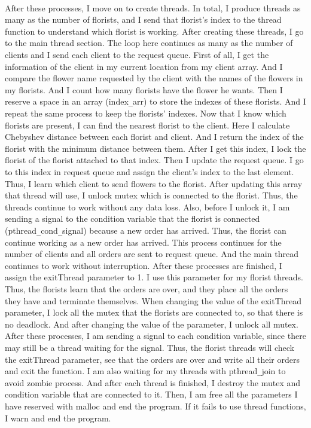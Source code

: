 \documentclass{article}
\begin{document}
\paragraph{}
After these processes, I move on to create threads. In total, I produce threads
as many as the number of florists, and I send that florist's index to the thread
function to understand which florist is working. After creating these threads, I
go to the main thread section. The loop here continues as many as the number
of clients and I send each client to the request queue. First of all, I get the
information of the client in my current location from my client array. And I
compare the flower name requested by the client with the names of the flowers
in my florists. And I count how many florists have the flower he wants. Then I
reserve a space in an array (index\verb!_!arr) to store the indexes of these florists. And I repeat the same process to keep the florists' indexes. Now that I know
which florists are present, I can find the nearest florist to the client. Here I
calculate Chebyshev distance between each florist and client. And I return the
index of the florist with the minimum distance between them. After I get this
index, I lock the florist of the florist attached to that index. Then I update the
request queue. I go to this index in request queue and assign the client's index
to the last element. Thus, I learn which client to send flowers to the florist. After
updating this array that thread will use, I unlock mutex which is connected to
the florist. Thus, the threads continue to work without any data loss. Also, before I unlock it, I am sending a signal to the condition variable that the florist
is connected (pthread\verb!_!cond\verb!_!signal) because a new order has arrived. Thus,
the florist can continue working as a new order has arrived. This process
continues for the number of clients and all orders are sent to request queue. And the main thread continues to work without interruption. After these
processes are finished, I assign the exitThread parameter to 1. I use this
parameter for my florist threads. Thus, the florists learn that the orders are over, and they place all the orders they have and terminate themselves. When
changing the value of the exitThread parameter, I lock all the mutex that the
florists are connected to, so that there is no deadlock. And after changing the
value of the parameter, I unlock all mutex. After these processes, I am sending
a signal to each condition variable, since there may still be a thread waiting for
the signal. Thus, the florist threads will check the exitThread parameter, see
that the orders are over and write all their orders and exit the function. I am
also waiting for my threads with pthread\verb!_!join to avoid zombie process. And
after each thread is finished, I destroy the mutex and condition variable that
are connected to it. Then, I am free all the parameters I have reserved with
malloc and end the program. If it fails to use thread functions, I warn and end
the program.
\mbox{}\\
\end{document}

